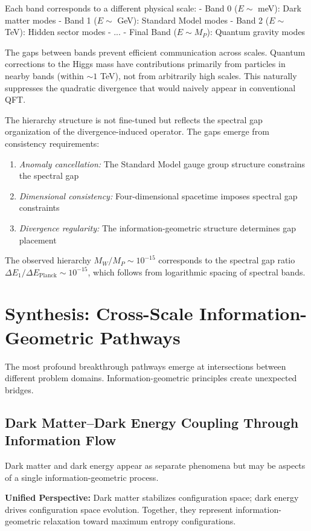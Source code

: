 \documentclass[12pt,a4paper]{article}
\begin{document}
Each band corresponds to a different physical scale:
- Band 0 ($E \sim$ meV): Dark matter modes
- Band 1 ($E \sim$ GeV): Standard Model modes
- Band 2 ($E \sim$ TeV): Hidden sector modes
- ...
- Final Band ($E \sim M_P$): Quantum gravity modes

The gaps between bands prevent efficient communication across scales. Quantum corrections to the Higgs mass have contributions primarily from particles in nearby bands (within $\sim 1$ TeV), not from arbitrarily high scales. This naturally suppresses the quadratic divergence that would naively appear in conventional QFT.

The hierarchy structure is not fine-tuned but reflects the spectral gap organization of the divergence-induced operator. The gaps emerge from consistency requirements:
\begin{enumerate}
\item \textit{Anomaly cancellation:} The Standard Model gauge group structure constrains the spectral gap
\item \textit{Dimensional consistency:} Four-dimensional spacetime imposes spectral gap constraints
\item \textit{Divergence regularity:} The information-geometric structure determines gap placement
\end{enumerate}

The observed hierarchy $M_W / M_P \sim 10^{-15}$ corresponds to the spectral gap ratio $\Delta E_1 / \Delta E_{\text{Planck}} \sim 10^{-15}$, which follows from logarithmic spacing of spectral bands.

\section{Synthesis: Cross-Scale Information-Geometric Pathways}

The most profound breakthrough pathways emerge at intersections between different problem domains. Information-geometric principles create unexpected bridges.

\subsection{Dark Matter--Dark Energy Coupling Through Information Flow}

Dark matter and dark energy appear as separate phenomena but may be aspects of a single information-geometric process.

\textbf{Unified Perspective:} Dark matter stabilizes configuration space; dark energy drives configuration space evolution. Together, they represent information-geometric relaxation toward maximum entropy configurations.
\end{document}
